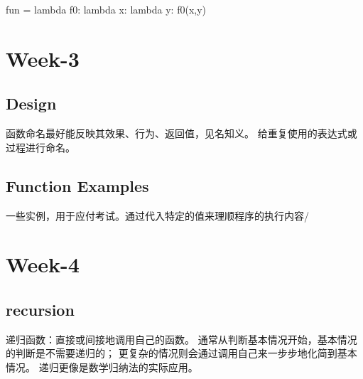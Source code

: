 \documentclass{ctexart}
\begin{document}
\begin{python}
fun = lambda f0: lambda x: lambda y: f0(x,y)   
\end{python}

\section{Week-3}

\subsection{Design}

函数命名最好能反映其效果、行为、返回值，见名知义。
给重复使用的表达式或过程进行命名。

\subsection{Function Examples}

 一些实例，用于应付考试。通过代入特定的值来理顺程序的执行内容/
 
\section{Week-4}

\subsection{recursion}

递归函数：直接或间接地调用自己的函数。
通常从判断基本情况开始，基本情况的判断是不需要递归的；
更复杂的情况则会通过调用自己来一步步地化简到基本情况。
递归更像是数学归纳法的实际应用。
\end{document}
